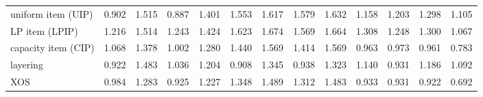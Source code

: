 \begin{table}[tp]
\begin{tabular}{@{}lcccccccccccc@{}}
    uniform item (UIP) & 0.902 & 1.515 & 0.887 & 1.401 & 1.553 & 1.617 & 1.579 & 1.632 & 1.158 & 1.203 & 1.298 & 1.105 \\
    LP item (LPIP) & 1.216 & 1.514 & 1.243 & 1.424 & 1.623 & 1.674 & 1.569 & 1.664 & 1.308 & 1.248 & 1.300 & 1.067 \\
    capacity item (CIP) & 1.068 & 1.378 & 1.002 & 1.280 & 1.440 & 1.569 & 1.414 & 1.569 & 0.963 & 0.973 & 0.961 & 0.783 \\
    layering & 0.922 & 1.483 & 1.036 & 1.204 & 0.908 & 1.345 & 0.938 & 1.323 & 1.140 & 0.931 & 1.186 & 1.092 \\
    XOS & 0.984 & 1.283 & 0.925 & 1.227 & 1.348 & 1.489 & 1.312 & 1.483 & 0.933 & 0.931 & 0.922 & 0.692 \\
    \bottomrule
  \end{tabular}
\end{table}
